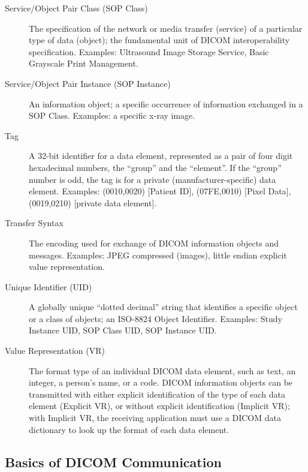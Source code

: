\documentclass[12pt, letterpaper]{article}
\begin{document}
\begin{description}
    \item [Service/Object Pair Class (SOP Class)] The specification of the network or media transfer (service) of a particular type of data (object); the fundamental unit of \gls{DICOM} interoperability specification.
        Examples: Ultrasound Image Storage Service, Basic Grayscale Print Management.

    \item [Service/Object Pair Instance (SOP Instance)] An information object; a specific occurrence of information exchanged in a \gls{SOP} Class.
        Examples: a specific x-ray image.

    \item [Tag] A 32-bit identifier for a data element, represented as a pair of four digit hexadecimal numbers, the ``group'' and the ``element''. If the ``group'' number is odd, the tag is for a private (manufacturer-specific) data element.
        Examples: (0010,0020) [Patient ID], (07FE,0010) [Pixel Data], (0019,0210) [private data element].

    \item [Transfer Syntax] The encoding used for exchange of \gls{DICOM} information objects and messages.
        Examples: JPEG compressed (images), little endian explicit value representation.

    \item [Unique Identifier (UID)] A globally unique ``dotted decimal'' string that identifies a specific object or a class of objects; an ISO-8824 Object Identifier.
        Examples: Study Instance UID, SOP Class UID, SOP Instance UID.\@

    \item [Value Representation (VR)] The format type of an individual \gls{DICOM} data element, such as text, an integer, a person's name, or a code.
        \gls{DICOM} information objects can be transmitted with either explicit identification of the type of each data element (Explicit \gls{VR}), or without explicit identification (Implicit \gls{VR}); with Implicit \gls{VR}, the receiving application must use a \gls{DICOM} data dictionary to look up the format of each data element.

\end{description}

\subsection{Basics of \gls{DICOM} Communication}
\end{document}
